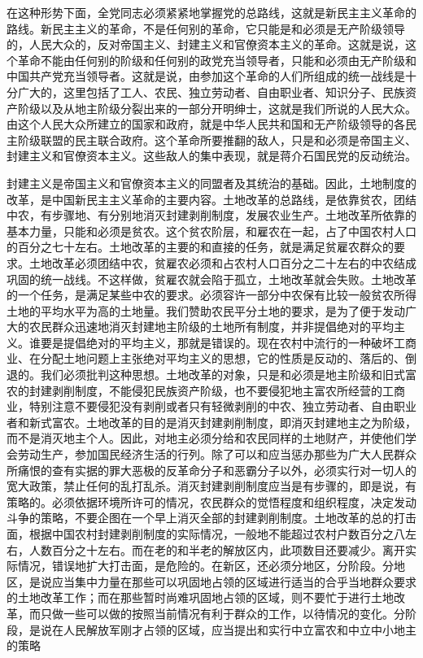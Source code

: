 \documentclass[UTF-8, a5paper, 12pt]{ctexart}
\begin{document}
在这种形势下面，全党同志必须紧紧地掌握党的总路线，这就是新民主主义革命的路线。新民主主义的革命，不是任何别的革命，它只能是和必须是无产阶级领导的，人民大众的，反对帝国主义、封建主义和官僚资本主义的革命。这就是说，这个革命不能由任何别的阶级和任何别的政党充当领导者，只能和必须由无产阶级和中国共产党充当领导者。这就是说，由参加这个革命的人们所组成的统一战线是十分广大的，这里包括了工人、农民、独立劳动者、自由职业者、知识分子、民族资产阶级以及从地主阶级分裂出来的一部分开明绅士，这就是我们所说的人民大众。由这个人民大众所建立的国家和政府，就是中华人民共和国和无产阶级领导的各民主阶级联盟的民主联合政府。这个革命所要推翻的敌人，只是和必须是帝国主义、封建主义和官僚资本主义。这些敌人的集中表现，就是蒋介石国民党的反动统治。

封建主义是帝国主义和官僚资本主义的同盟者及其统治的基础。因此，土地制度的改革，是中国新民主主义革命的主要内容。土地改革的总路线，是依靠贫农，团结中农，有步骤地、有分别地消灭封建剥削制度，发展农业生产。土地改革所依靠的基本力量，只能和必须是贫农。这个贫农阶层，和雇农在一起，占了中国农村人口的百分之七十左右。土地改革的主要的和直接的任务，就是满足贫雇农群众的要求。土地改革必须团结中农，贫雇农必须和占农村人口百分之二十左右的中农结成巩固的统一战线。不这样做，贫雇农就会陷于孤立，土地改革就会失败。土地改革的一个任务，是满足某些中农的要求。必须容许一部分中农保有比较一般贫农所得土地的平均水平为高的土地量。我们赞助农民平分土地的要求，是为了便于发动广大的农民群众迅速地消灭封建地主阶级的土地所有制度，并非提倡绝对的平均主义。谁要是提倡绝对的平均主义，那就是错误的。现在农村中流行的一种破坏工商业、在分配土地问题上主张绝对平均主义的思想，它的性质是反动的、落后的、倒退的。我们必须批判这种思想。土地改革的对象，只是和必须是地主阶级和旧式富农的封建剥削制度，不能侵犯民族资产阶级，也不要侵犯地主富农所经营的工商业，特别注意不要侵犯没有剥削或者只有轻微剥削的中农、独立劳动者、自由职业者和新式富农。土地改革的目的是消灭封建剥削制度，即消灭封建地主之为阶级，而不是消灭地主个人。因此，对地主必须分给和农民同样的土地财产，并使他们学会劳动生产，参加国民经济生活的行列。除了可以和应当惩办那些为广大人民群众所痛恨的查有实据的罪大恶极的反革命分子和恶霸分子以外，必须实行对一切人的宽大政策，禁止任何的乱打乱杀。消灭封建剥削制度应当是有步骤的，即是说，有策略的。必须依据环境所许可的情况，农民群众的觉悟程度和组织程度，决定发动斗争的策略，不要企图在一个早上消灭全部的封建剥削制度。土地改革的总的打击面，根据中国农村封建剥削制度的实际情况，一般地不能超过农村户数百分之八左右，人数百分之十左右。而在老的和半老的解放区内，此项数目还要减少。离开实际情况，错误地扩大打击面，是危险的。在新区，还必须分地区，分阶段。分地区，是说应当集中力量在那些可以巩固地占领的区域进行适当的合乎当地群众要求的土地改革工作；而在那些暂时尚难巩固地占领的区域，则不要忙于进行土地改革，而只做一些可以做的按照当前情况有利于群众的工作，以待情况的变化。分阶段，是说在人民解放军刚才占领的区域，应当提出和实行中立富农和中立中小地主的策略
\end{document}
